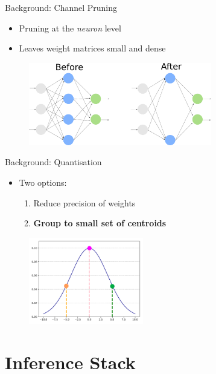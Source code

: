 \documentclass[xcolor=dvipsnames]{beamer}
\begin{document}
\begin{frame}{Background: Channel Pruning}

\begin{itemize}
    \item Pruning at the \textit{neuron} level
    \item Leaves weight matrices small and dense
\end{itemize}

\begin{figure}
    \centering
    \includegraphics[width=8cm]{images/channel_pruning.pdf}
    \label{fig:channel_pruning}
\end{figure}

\end{frame}


\begin{frame}{Background: Quantisation}
\begin{itemize}
    \item Two options:
    \begin{enumerate}
        \item Reduce precision of weights
        \item \textbf{Group to small set of centroids}
    \end{enumerate}
\end{itemize}

\begin{figure}
    \centering
    \includegraphics[width=5cm]{images/quantization.pdf}
\end{figure}


\end{frame}

\section{Inference Stack}
\end{document}
